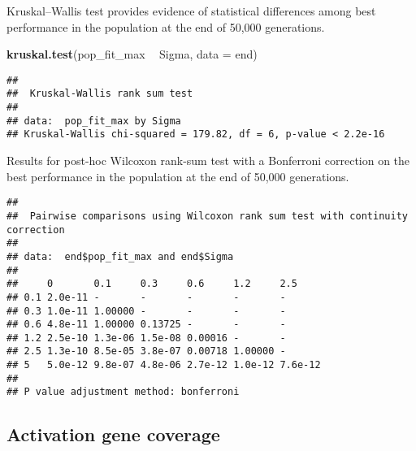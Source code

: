 \documentclass[]{book}
\newenvironment{Shaded}{\begin{snugshade}}{\end{snugshade}}
\newcommand{\DataTypeTok}[1]{\textcolor[rgb]{0.13,0.29,0.53}{#1}}
\newcommand{\KeywordTok}[1]{\textcolor[rgb]{0.13,0.29,0.53}{\textbf{#1}}}
\newcommand{\NormalTok}[1]{#1}
\newcommand{\OperatorTok}[1]{\textcolor[rgb]{0.81,0.36,0.00}{\textbf{#1}}}
\newcommand{\OtherTok}[1]{\textcolor[rgb]{0.56,0.35,0.01}{#1}}
\newcommand{\StringTok}[1]{\textcolor[rgb]{0.31,0.60,0.02}{#1}}
\begin{document}
Kruskal--Wallis test provides evidence of statistical differences among best performance in the population at the end of 50,000 generations.

\begin{Shaded}
\begin{Highlighting}[]
\KeywordTok{kruskal.test}\NormalTok{(pop_fit_max }\OperatorTok{~}\StringTok{ }\NormalTok{Sigma, }\DataTypeTok{data =}\NormalTok{ end)}
\end{Highlighting}
\end{Shaded}

\begin{verbatim}
## 
##  Kruskal-Wallis rank sum test
## 
## data:  pop_fit_max by Sigma
## Kruskal-Wallis chi-squared = 179.82, df = 6, p-value < 2.2e-16
\end{verbatim}

Results for post-hoc Wilcoxon rank-sum test with a Bonferroni correction on the best performance in the population at the end of 50,000 generations.

\begin{Shaded}
\end{Shaded}

\begin{verbatim}
## 
##  Pairwise comparisons using Wilcoxon rank sum test with continuity correction 
## 
## data:  end$pop_fit_max and end$Sigma 
## 
##     0       0.1     0.3     0.6     1.2     2.5    
## 0.1 2.0e-11 -       -       -       -       -      
## 0.3 1.0e-11 1.00000 -       -       -       -      
## 0.6 4.8e-11 1.00000 0.13725 -       -       -      
## 1.2 2.5e-10 1.3e-06 1.5e-08 0.00016 -       -      
## 2.5 1.3e-10 8.5e-05 3.8e-07 0.00718 1.00000 -      
## 5   5.0e-12 9.8e-07 4.8e-06 2.7e-12 1.0e-12 7.6e-12
## 
## P value adjustment method: bonferroni
\end{verbatim}

\hypertarget{activation-gene-coverage-9}{%
\subsection{Activation gene coverage}\label{activation-gene-coverage-9}}
\end{document}
